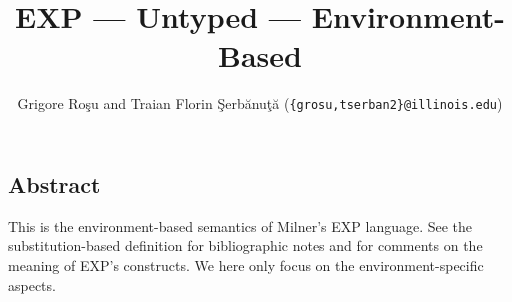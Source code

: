 \setlength{\parindent}{1em}
\title{EXP --- Untyped --- Environment-Based}
\author{Grigore Ro\c{s}u and
        Traian Florin \c{S}erb\u{a}nu\c{t}\u{a}
	(\texttt{\{grosu,tserban2\}@illinois.edu})}

\maketitle

\begin{kblock}[text]
\section{Abstract}
This is the environment-based \K semantics of Milner's EXP
language.  See the substitution-based definition for bibliographic
notes and for comments on the meaning of EXP's constructs.  We here
only focus on the environment-specific aspects.
\end{kblock}

\vspace*{3ex}
